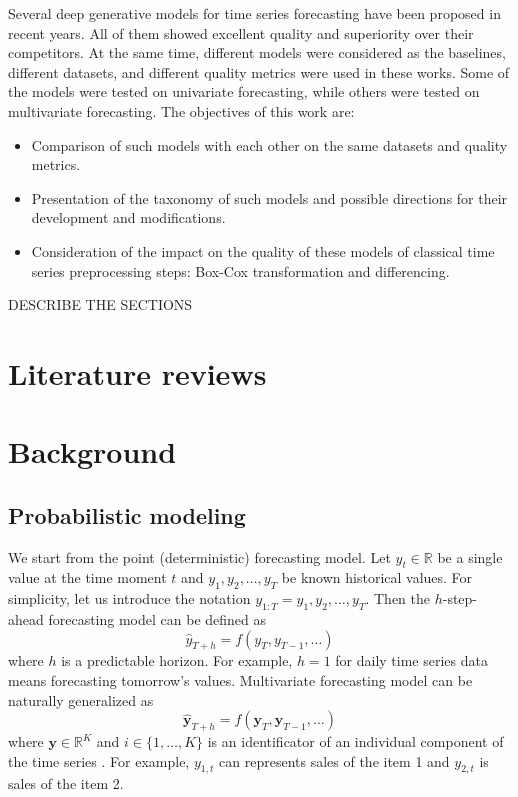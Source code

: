 \documentclass[12pt,a4paper]{article}
\begin{document}
Several deep generative models for time series forecasting have been proposed in recent years. All of them showed excellent quality and superiority over their competitors. At the same time, different models were considered as the baselines, different datasets, and different quality metrics were used in these works. Some of the models were tested on univariate forecasting, while others were tested on multivariate forecasting. The objectives of this work are:
\begin{itemize}
    \item Comparison of such models with each other on the same datasets and quality metrics.
    \item Presentation of the taxonomy of such models and possible directions for their development and modifications.
    \item Consideration of the impact on the quality of these models of classical time series preprocessing steps: Box-Cox transformation and differencing.
\end{itemize}
DESCRIBE THE SECTIONS

\section{Literature reviews}

\section{Background}

\subsection{Probabilistic modeling}

We start from the point (deterministic) forecasting model. Let $y_t \in \mathbb R$ be a single value at the time moment $t$ and $y_1, y_2, \dots, y_T$ be known historical values. For simplicity, let us introduce the notation $y_{1:T} = y_1, y_2, \dots, y_T$. Then the $h$-step-ahead forecasting model can be defined as 
$$\hat{y}_{T+h} = f(y_T, y_{T-1}, \dots)$$
where $h$ is a predictable horizon. For example, $h=1$ for daily time series data means forecasting tomorrow's values. Multivariate forecasting model can be naturally generalized as
$$\hat{\mathbf y}_{T+h} = f(\mathbf y_T, \mathbf y_{T-1}, \dots)$$
where $\mathbf y \in \mathbb R^K$ and $i \in \{1, \dots, K\}$ is an identificator of an individual component of the time series \cite{mts2007}. For example, $y_{1,t}$ can represents sales of the item 1 and $y_{2,t}$ is sales of the item 2. 
\end{document}
